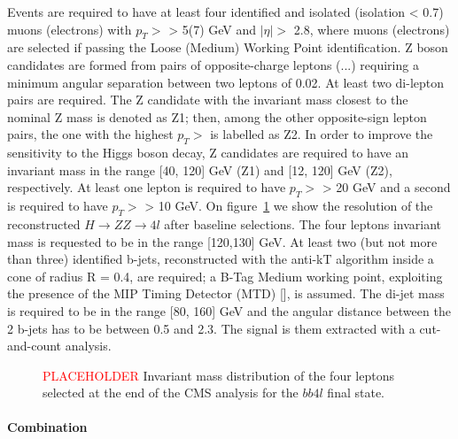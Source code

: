 Events are required to have at least four identified and isolated (isolation < 0.7) muons (electrons) with $p_T >$ > 5(7) GeV and $|\eta| >$ 2.8, where muons (electrons) are selected if passing the Loose (Medium) Working Point identification. Z boson candidates are formed from pairs of opposite-charge leptons (...) requiring a minimum angular separation between two leptons of 0.02. At least two di-lepton pairs are required. The Z candidate with the invariant mass closest to the nominal Z mass is denoted as Z1; then, among the other opposite-sign lepton pairs, the one with the highest $p_T >$ is labelled as Z2. In order to improve the sensitivity to the Higgs boson decay, Z candidates are required to have an invariant mass in the range [40, 120] GeV (Z1) and [12, 120] GeV (Z2), respectively. At least one lepton is required to have $p_T >$ > 20 GeV and a second is required to have $p_T >$ > 10 GeV. On figure~\ref{fig:CMS_HH4l} we show the resolution of the reconstructed $H \rightarrow ZZ \rightarrow 4l$ after baseline selections. The four leptons invariant mass is requested to be in the range [120,130] GeV. At least two (but not more than three) identified b-jets, reconstructed with the anti-kT algorithm inside a cone of radius R = 0.4, are required; a B-Tag Medium working point, exploiting the presence of the MIP Timing Detector (MTD) [], is assumed. The di-jet mass is required to be in the range [80, 160] GeV and the angular distance between the 2 b-jets has to be between 0.5 and 2.3. The signal is them extracted with a cut-and-count analysis.

\begin{figure}[!htb]
\centering 
\caption{\textcolor{red}{PLACEHOLDER} Invariant mass distribution of the four leptons selected at the end of the CMS analysis for the $bb 4l$ final state.} 
\label{fig:CMS_HH4l} 
\end{figure}

\paragraph{Combination}
